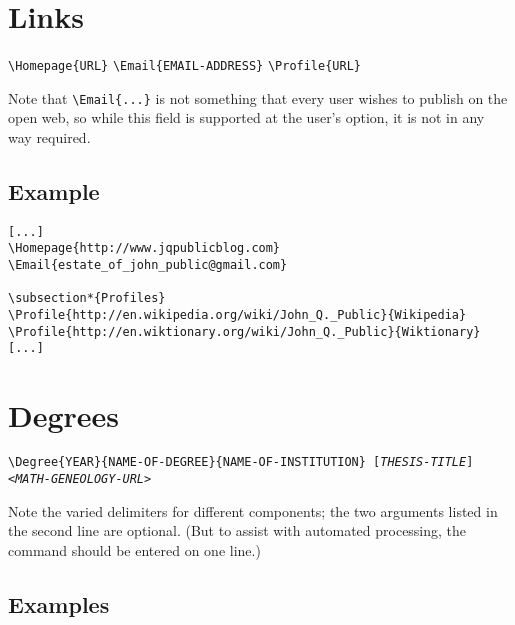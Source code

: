 \documentclass[letterpaper]{article}
\begin{document}
\section{Links}


\begin{mdframed}
\texttt{\textbackslash Homepage\{URL\}} \quad
\texttt{\textbackslash Email\{EMAIL-ADDRESS\}} \quad
\texttt{\textbackslash Profile\{URL\}}
\end{mdframed}

Note that \verb|\Email{...}| is not something that every user wishes
to publish on the open web, so while this field is supported at the
user's option, it is not in any way required.  

\subsection*{Example}

\begin{verbatim}
[...]
\Homepage{http://www.jqpublicblog.com}
\Email{estate_of_john_public@gmail.com}

\subsection*{Profiles}
\Profile{http://en.wikipedia.org/wiki/John_Q._Public}{Wikipedia}
\Profile{http://en.wiktionary.org/wiki/John_Q._Public}{Wiktionary}
[...]
\end{verbatim}

\section{Degrees}

\begin{mdframed}
\texttt{\textbackslash Degree\{YEAR\}\{NAME-OF-DEGREE\}\{NAME-OF-INSTITUTION\}\newline
\hspace*{2cm}[\emph{THESIS-TITLE}]<\emph{MATH-GENEOLOGY-URL}>}
\end{mdframed}

Note the varied delimiters for different components; the two arguments
listed in the second line are optional.  (But to assist with automated
processing, the command should be entered on one line.)

\subsection*{Examples}
\end{document}
